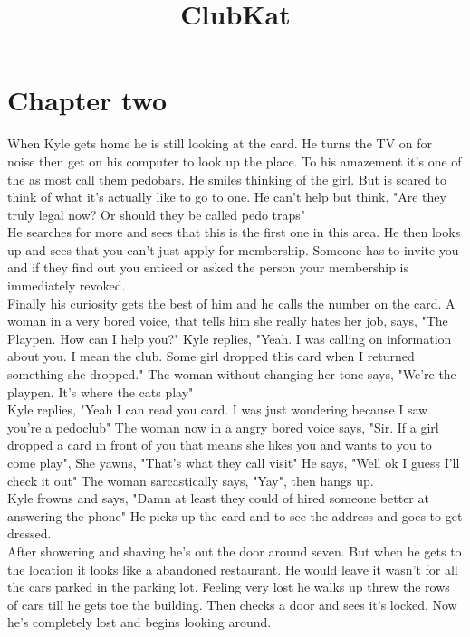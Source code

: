 \documentclass {article}[12pt]
\title {ClubKat}
\date {}
\begin{document}
\section *{Chapter two}
When Kyle gets home he is still looking at the card. He turns the TV on for noise then get on his computer to look up the place. To his amazement it's one of the as most call them pedobars. He smiles thinking of the girl. But is scared to think of what it's actually like to go to one. He can't help but think, "Are they truly legal now? Or should they be called pedo traps"\\

He searches for more and sees that this is the first one in this area. He then looks up and sees that  you can't just apply for membership. Someone has to invite you and if they find out you enticed or asked the person your membership is immediately revoked. \\

Finally his curiosity gets the best of him and he calls the number on the card. A woman in a very bored voice, that tells him she really hates her job, says, "The Playpen. How can I help you?" Kyle replies, "Yeah. I was calling on information about you. I mean the club. Some girl dropped this card when I returned something she dropped." The woman without changing her tone says, "We're the playpen. It's where the cats play"\\

Kyle replies, "Yeah I can read you card. I was just wondering because I saw you're a pedoclub" The woman now in a angry bored voice says, "Sir. If a girl dropped a card in front of you that means she likes you and wants to you to come play", She yawns, "That's what they call visit" He says, "Well ok I guess I'll check it out" The woman sarcastically says, "Yay", then hangs up.\\

Kyle frowns and says, "Damn at least they could of hired someone better at answering the phone" He picks up the card and to see the address and goes to get dressed.\\

After showering and shaving he's out the door around seven. But when he gets to the location it looks like a abandoned restaurant. He would leave it wasn't for all the cars parked in the parking lot. Feeling very lost he walks up threw the rows of cars till he gets toe the building. Then checks a door and sees it's locked. Now he's completely lost and begins looking around. \\
\end{document}
